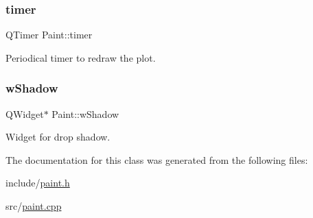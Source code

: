 \subsubsection{\texorpdfstring{timer}{timer}}
{\footnotesize\ttfamily Q\+Timer Paint\+::timer\hspace{0.3cm}{\ttfamily [private]}}



Periodical timer to redraw the plot. 

\mbox{\label{classPaint_a6263fca255c858e9cbf7f549392b9e9e}} 
\subsubsection{\texorpdfstring{wShadow}{wShadow}}
{\footnotesize\ttfamily Q\+Widget$\ast$ Paint\+::w\+Shadow\hspace{0.3cm}{\ttfamily [private]}}



Widget for drop shadow. 



The documentation for this class was generated from the following files\+:\begin{DoxyCompactItemize}
\item 
include/\mbox{\hyperlink{paint_8h}{paint.\+h}}\item 
src/\mbox{\hyperlink{paint_8cpp}{paint.\+cpp}}\end{DoxyCompactItemize}
